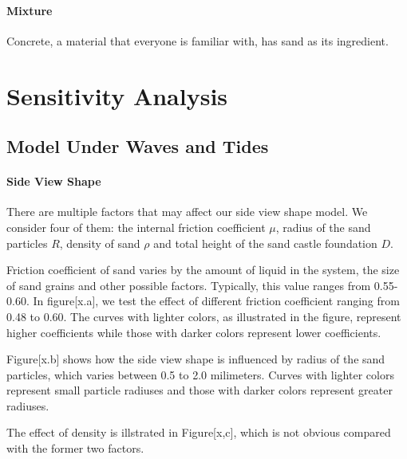 \documentclass[12pt]{article}
\begin{document}
\paragraph{Mixture}
Concrete, a material that everyone is familiar with, has sand as its ingredient.

\section{Sensitivity Analysis}
\subsection{Model Under Waves and Tides}
\paragraph{Side View Shape}
\par
There are multiple factors that may affect our side view shape model. We consider four of them: the internal friction coefficient $\mu$, radius of the sand particles $R$, density of sand $\rho$ and total height of the sand castle foundation $D$.
\par
Friction coefficient of sand varies by the amount of liquid in the system, the size of sand grains and other possible factors. Typically, this value ranges from 0.55-0.60. In figure[x.a], we test the effect of different friction coefficient ranging from 0.48 to 0.60. The curves with lighter colors, as illustrated in the figure, represent higher coefficients while those with darker colors represent lower coefficients.
\par
Figure[x.b] shows how the side view shape is influenced by radius of the sand particles, which varies between 0.5 to 2.0 milimeters. Curves with lighter colors represent small particle radiuses and those with darker colors represent greater radiuses.
\par
The effect of density is illstrated in Figure[x,c], which is not obvious compared with the former two factors.
\end{document}
